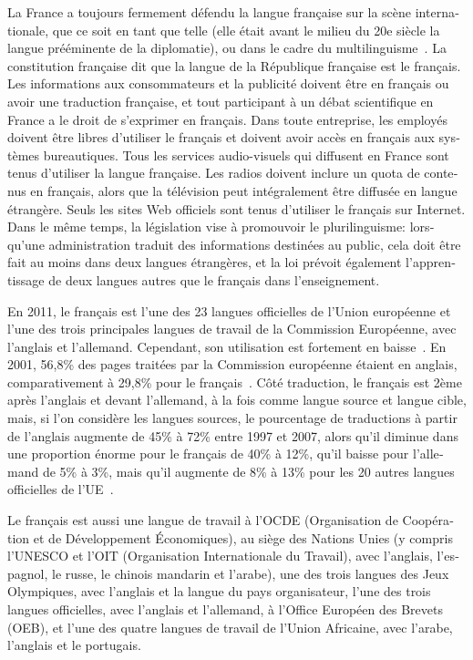 \begin{french}
\begin{multicols}{2}
La France a toujours fermement défendu la langue française sur la
scène internationale, que ce soit en tant que telle (elle était avant
le milieu du 20e siècle la langue prééminente de la diplomatie), ou
dans le cadre du multilinguisme~\cite{multilinguisme}. La constitution
française dit que la langue de la République française est le
français. Les informations aux consommateurs et la publicité doivent
être en français ou avoir une traduction française, et tout
participant à un débat scientifique en France a le droit de s'exprimer en français. Dans toute entreprise, les employés doivent
être libres d'utiliser le français et doivent avoir accès en
français aux systèmes bureautiques. Tous les services audio-visuels
qui diffusent en France sont tenus d'utiliser la langue française. Les
radios doivent inclure un quota de contenus en français, alors que la
télévision peut intégralement être diffusée en langue étrangère. Seuls
les sites Web officiels sont tenus d'utiliser le français sur
Internet. Dans le même temps, la législation vise à promouvoir le
plurilinguisme: lorsqu'une administration traduit des
informations destinées au public, cela doit être fait au moins dans
deux langues étrangères, et la loi prévoit également l'apprentissage 
de deux langues autres que le français dans l'enseignement.

En 2011, le français est l'une des 23 langues officielles de
l'Union européenne et l'une des trois principales
langues de travail de la Commission Européenne, avec l'anglais
et l'allemand. Cependant, son utilisation est fortement en
baisse~\cite{baisse}. En 2001, 56,8\% des pages traitées par la
Commission européenne étaient en anglais, comparativement à 29,8\%
pour le français~\cite{francais}. Côté traduction, le français
est 2ème après l'anglais et devant l'allemand, à la
fois comme langue source et langue cible, mais, si l'on
considère les langues sources, le pourcentage de traductions à partir
de l'anglais augmente de 45\% à 72\% entre 1997 et 2007, alors
qu'il diminue dans une proportion énorme pour le français de
40\% à 12\%, qu'il baisse pour l'allemand de 5\% à
3\%, mais qu'il augmente de 8\% à 13\% pour les 20 autres
langues officielles de l'UE~\cite{dgt08}.

Le français est aussi une langue de travail à l'OCDE
(Organisation de Coopération et de Développement Économiques), au
siège des Nations Unies (y compris l'UNESCO et l'OIT
(Organisation Internationale du Travail), avec l'anglais,
l'espagnol, le russe, le chinois mandarin et l'arabe),
une des trois langues des Jeux Olympiques, avec l'anglais et
la langue du pays organisateur, l'une des trois langues
officielles, avec l'anglais et l'allemand, à l'Office Européen des Brevets (OEB), et l'une des quatre
langues de travail de l'Union Africaine, avec l'arabe,
l'anglais et le portugais.


\end{multicols}
\end{french}
